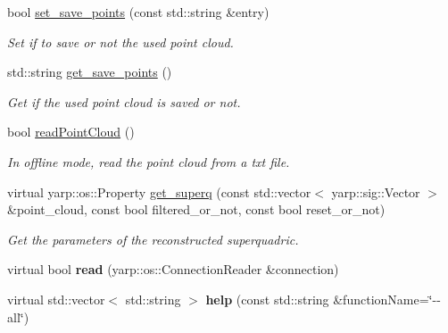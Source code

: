 \begin{DoxyCompactItemize}
bool \mbox{\hyperlink{classSuperqModule_a90826fc53859ecf126f22a2569611b2c}{set\+\_\+save\+\_\+points}} (const std\+::string \&entry)
\begin{DoxyCompactList}\small\item\em Set if to save or not the used point cloud. \end{DoxyCompactList}\item 
std\+::string \mbox{\hyperlink{classSuperqModule_adfeeea091edd0d32d388b072f4fc9d93}{get\+\_\+save\+\_\+points}} ()
\begin{DoxyCompactList}\small\item\em Get if the used point cloud is saved or not. \end{DoxyCompactList}\item 
\mbox{\label{classSuperqModule_a0e6af855b1a0f647ff4b9deca973c55d}} 
bool \mbox{\hyperlink{classSuperqModule_a0e6af855b1a0f647ff4b9deca973c55d}{read\+Point\+Cloud}} ()
\begin{DoxyCompactList}\small\item\em In offline mode, read the point cloud from a txt file. \end{DoxyCompactList}\item 
virtual yarp\+::os\+::\+Property \mbox{\hyperlink{classsuperquadricModel__IDL_a10039bb93445066d9dd29d8f6c9ef6c5}{get\+\_\+superq}} (const std\+::vector$<$ yarp\+::sig\+::\+Vector $>$ \&point\+\_\+cloud, const bool filtered\+\_\+or\+\_\+not, const bool reset\+\_\+or\+\_\+not)
\begin{DoxyCompactList}\small\item\em Get the parameters of the reconstructed superquadric. \end{DoxyCompactList}\item 
\mbox{\label{classsuperquadricModel__IDL_ac72a24dddca13978d7adcd5cf4f40b1f}} 
virtual bool {\bfseries read} (yarp\+::os\+::\+Connection\+Reader \&connection)
\item 
\mbox{\label{classsuperquadricModel__IDL_a263ca3dc1c7a21cc3ac40caadc95cf3d}} 
virtual std\+::vector$<$ std\+::string $>$ {\bfseries help} (const std\+::string \&function\+Name=\char`\"{}-\/-\/all\char`\"{})
\end{DoxyCompactItemize}
